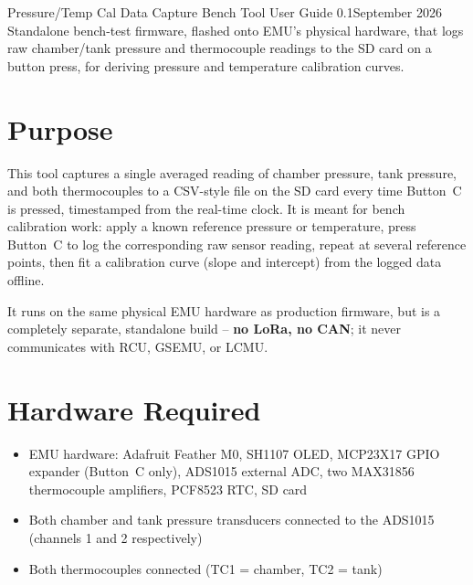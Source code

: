 \documentclass[11pt,letterpaper]{article}
\newcommand{\docversion}{0.1}
\newcommand{\docdate}{September 2026}
\begin{document}


\KJOtitlepage%
  {Pressure/Temp Cal Data Capture}%
  {Bench Tool User Guide}%
  {\docversion}{\docdate}%
  {Standalone bench-test firmware, flashed onto EMU's physical hardware,
   that logs raw chamber/tank pressure and thermocouple readings to the SD
   card on a button press, for deriving pressure and temperature
   calibration curves.}

\tableofcontents\newpage

\section{Purpose}

This tool captures a single averaged reading of chamber pressure, tank
pressure, and both thermocouples to a CSV-style file on the SD card every
time Button~C is pressed, timestamped from the real-time clock. It is
meant for bench calibration work: apply a known reference pressure or
temperature, press Button~C to log the corresponding raw sensor reading,
repeat at several reference points, then fit a calibration curve (slope
and intercept) from the logged data offline.

It runs on the same physical EMU hardware as production firmware, but is
a completely separate, standalone build -- \textbf{no LoRa, no CAN}; it
never communicates with RCU, GSEMU, or LCMU.

\section{Hardware Required}

\begin{itemize}[nosep]
  \item EMU hardware: Adafruit Feather M0, SH1107 OLED, MCP23X17 GPIO
        expander (Button~C only), ADS1015 external ADC, two MAX31856
        thermocouple amplifiers, PCF8523 RTC, SD card
  \item Both chamber and tank pressure transducers connected to the
        ADS1015 (channels 1 and 2 respectively)
  \item Both thermocouples connected (TC1 = chamber, TC2 = tank)
\end{itemize}
\end{document}
